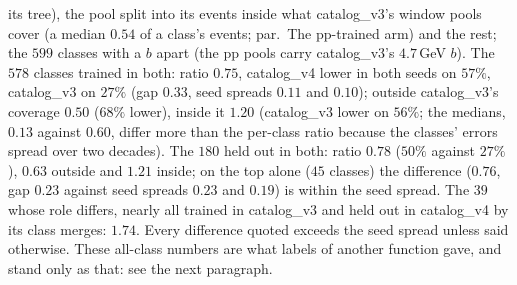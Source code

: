 \documentclass[11pt]{article}
\begin{document}
its tree), the pool split into its events inside what catalog\_v3's window pools cover (a median $0.54$ of a class's
events; par.\ The pp-trained arm) and the rest; the $599$ classes with a $b$ apart (the pp pools carry catalog\_v3's
$4.7$\,GeV $b$). The $578$ classes trained in both: ratio $0.75$, catalog\_v4 lower in both seeds on $57\%$, catalog\_v3
on $27\%$ (gap $0.33$, seed spreads $0.11$ and $0.10$); outside catalog\_v3's coverage $0.50$ ($68\%$ lower), inside it
$1.20$ (catalog\_v3 lower on $56\%$; the medians, $0.13$ against $0.60$, differ more than the per-class ratio because
the classes' errors spread over two decades). The $180$ held out in both: ratio $0.78$ ($50\%$ against $27\%$),
$0.63$ outside and $1.21$ inside; on the top alone ($45$ classes) the difference ($0.76$, gap $0.23$ against seed spreads $0.23$ and $0.19$) is within the
seed spread. The $39$ whose role
differs, nearly all trained in catalog\_v3 and held out in catalog\_v4 by its class merges: $1.74$. Every difference
quoted exceeds the seed spread unless said otherwise. These all-class numbers are what labels of another function
gave, and stand only as that: see the next paragraph.
\end{document}
